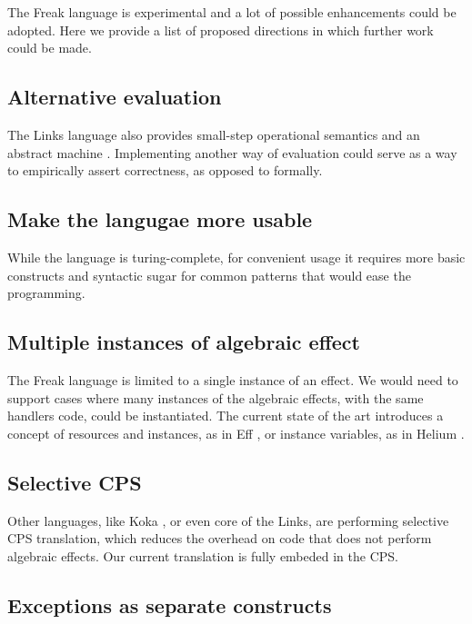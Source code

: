 \documentclass{article}
\theoremstyle{definition}
\theoremstyle{lemma}
\theoremstyle{observation}
\theoremstyle{theorem}
\begin{document}
    The Freak language is experimental and a lot of possible enhancements
    could be adopted. Here we provide a list of proposed directions in which
    further work could be made.

    \subsection{Alternative evaluation}

    The Links language also provides small-step operational semantics and
    an abstract machine \cite{liberating-effects}. Implementing another way
    of evaluation could serve as a way to empirically assert correctness,
    as opposed to formally.

    \subsection{Make the langugae more usable}

    While the language is turing-complete, for convenient usage it
    requires more basic constructs and syntactic sugar for common patterns
    that would ease the programming.

    \subsection{Multiple instances of algebraic effect}

    The Freak language is limited to a single instance of an effect. We would
    need to support cases where many instances of the algebraic effects, with
    the same handlers code, could be instantiated. The current state of the
    art introduces a concept of resources and instances, as in Eff \cite{programming-in-eff},
    or instance variables, as in Helium \cite{binders-labels}.

    \subsection{Selective CPS}

    Other languages, like Koka \cite{leijen-koka}, or even core of the Links, are
    performing selective CPS translation, which reduces the overhead on code
    that does not perform algebraic effects. Our current translation is fully
    embeded in the CPS.

    \subsection{Exceptions as separate constructs}
\end{document}
